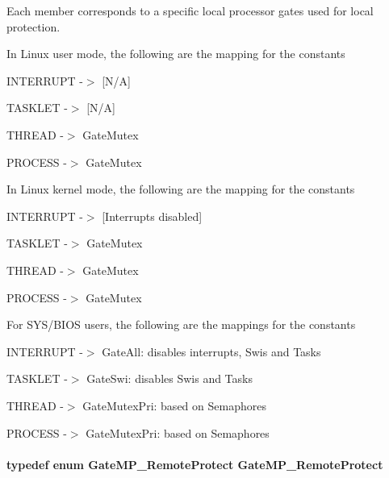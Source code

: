 Each member corresponds to a specific local processor gates used for local protection.

In Linux user mode, the following are the mapping for the constants
\begin{DoxyItemize}
\item I\-N\-T\-E\-R\-R\-U\-P\-T -\/$>$ \mbox{[}N/\-A\mbox{]}
\item T\-A\-S\-K\-L\-E\-T -\/$>$ \mbox{[}N/\-A\mbox{]}
\item T\-H\-R\-E\-A\-D -\/$>$ Gate\-Mutex
\item P\-R\-O\-C\-E\-S\-S -\/$>$ Gate\-Mutex
\end{DoxyItemize}

In Linux kernel mode, the following are the mapping for the constants
\begin{DoxyItemize}
\item I\-N\-T\-E\-R\-R\-U\-P\-T -\/$>$ \mbox{[}Interrupts disabled\mbox{]}
\item T\-A\-S\-K\-L\-E\-T -\/$>$ Gate\-Mutex
\item T\-H\-R\-E\-A\-D -\/$>$ Gate\-Mutex
\item P\-R\-O\-C\-E\-S\-S -\/$>$ Gate\-Mutex
\end{DoxyItemize}

For S\-Y\-S/\-B\-I\-O\-S users, the following are the mappings for the constants
\begin{DoxyItemize}
\item I\-N\-T\-E\-R\-R\-U\-P\-T -\/$>$ Gate\-All\-: disables interrupts, Swis and Tasks
\item T\-A\-S\-K\-L\-E\-T -\/$>$ Gate\-Swi\-: disables Swis and Tasks
\item T\-H\-R\-E\-A\-D -\/$>$ Gate\-Mutex\-Pri\-: based on Semaphores
\item P\-R\-O\-C\-E\-S\-S -\/$>$ Gate\-Mutex\-Pri\-: based on Semaphores 
\end{DoxyItemize}
\paragraph[{Gate\-M\-P\-\_\-\-Remote\-Protect}]{\setlength{\rightskip}{0pt plus 5cm}typedef enum {\bf Gate\-M\-P\-\_\-\-Remote\-Protect}  {\bf Gate\-M\-P\-\_\-\-Remote\-Protect}}\label{_gate_m_p_8h_a1400ba94db5b5fefd196649a9c9a4c63}


